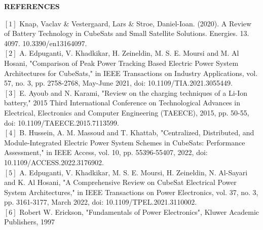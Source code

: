 \thispagestyle{plain}

\begin{center}
	\Large {\bf \uppercase{References}}
\end{center}

\vspace{3\baselineskip}
\noindent
\setlength\parindent{0pt}
$[1]$ Knap, Vaclav & Vestergaard, Lars & Stroe, Daniel-Ioan. (2020). A Review of Battery Technology in CubeSats and Small Satellite Solutions. Energies. 13. 4097. 10.3390/en13164097.
\vspace{3.5pt}
\\ 
$[2]$ A. Edpuganti, V. Khadkikar, H. Zeineldin, M. S. E. Moursi and M. Al Hosani, "Comparison of Peak Power Tracking Based Electric Power System Architectures for CubeSats," in IEEE Transactions on Industry Applications, vol. 57, no. 3, pp. 2758-2768, May-June 2021, doi: 10.1109/TIA.2021.3055449.
\vspace{3.5pt}
\\ 
$[3]$ E. Ayoub and N. Karami, "Review on the charging techniques of a Li-Ion battery," 2015 Third International Conference on Technological Advances in Electrical, Electronics and Computer Engineering (TAEECE), 2015, pp. 50-55, doi: 10.1109/TAEECE.2015.7113599.
\vspace{3.5pt}
\\ 
$[4]$ B. Hussein, A. M. Massoud and T. Khattab, "Centralized, Distributed, and Module-Integrated Electric Power System Schemes in CubeSats: Performance Assessment," in IEEE Access, vol. 10, pp. 55396-55407, 2022, doi: 10.1109/ACCESS.2022.3176902.
\vspace{3.5pt}
\\ 
$[5]$ A. Edpuganti, V. Khadkikar, M. S. E. Moursi, H. Zeineldin, N. Al-Sayari and K. Al Hosani, "A Comprehensive Review on CubeSat Electrical Power System Architectures," in IEEE Transactions on Power Electronics, vol. 37, no. 3, pp. 3161-3177, March 2022, doi: 10.1109/TPEL.2021.3110002.
\vspace{3.5pt}
\\ 
$[6]$ Robert W. Erickson, "Fundamentals of Power Electronics", Kluwer Academic Publishers, 1997